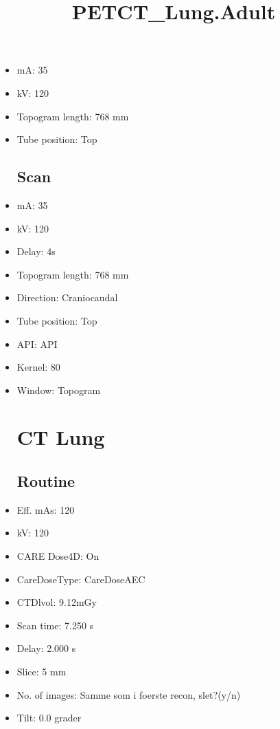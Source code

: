 \documentclass[12pt]{article}
\title{PETCT\_Lung.Adult}
\begin{document}
\maketitle
\newpage
\tableofcontents
\newpage
{}


\begin{itemize}\section{Topogram}
\subsection{Routine}
\item mA: 35\item kV: 120\item Topogram length: 768 mm\item Tube position: Top
\subsection{Scan}\item mA: 35\item kV: 120\item Delay: 4s\item Topogram length: 768 mm\item Direction: Craniocaudal\item Tube position: Top\item API: API \item Kernel: 80\item Window: Topogram
\section{CT Lung}
\subsection{Routine}
\item Eff. mAs: 120\item kV: 120\item CARE Dose4D: On\item CareDoseType: CareDoseAEC\item CTDlvol: 9.12mGy\item Scan time: 7.250 s\item Delay: 2.000 s\item Slice: 5 mm\item No. of images: Samme som i foerste recon, slet?(y/n)\item Tilt: 0.0 grader

\end{itemize}
\end{document}
